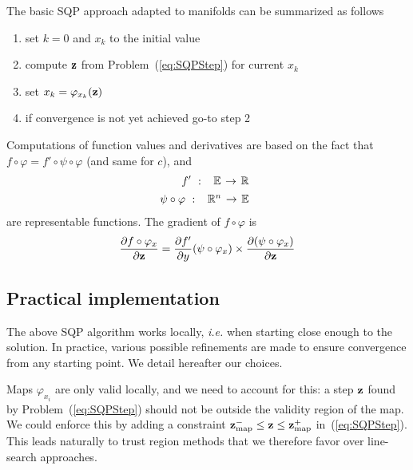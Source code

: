 The basic SQP approach adapted to manifolds can be summarized as follows
\begin{enumerate}
	\item set $k=0$ and $x_k$ to the initial value
  \item compute ${\bf z}$ from Problem~(\ref{eq:SQPStep}) for current $x_k$
  \item set $x_k = \varphi_{x_k}({\bf z})$
	\item if convergence is not yet achieved go-to step 2
\end{enumerate}

Computations of function values and derivatives are based on the fact that $f \circ \varphi = f' \circ \psi \circ \varphi$ (and same for $c$), and
\begin{align}
  f'\ :\
  \begin{array}{ccc}
    \mathbb{E} & \reduce{\rightarrow}{6} & \mathbb{R}
  \end{array} \nonumber \\
	\psi \circ \varphi\ :\
  \begin{array}{ccc}
    \mathbb{R}^n & \reduce{\rightarrow}{6} & \mathbb{E}
  \end{array} \nonumber
\end{align}
are representable functions. The gradient of $f \circ \varphi$ is
\begin{align}
  \frac{\partial f\circ\varphi_x}{\partial {\bf z}}=
  \frac{\partial f'}{\partial y}(\psi\circ\varphi_x)\times
  \frac{\partial (\psi\circ\varphi_x)}{\partial {\bf z}}
\end{align}

\subsection{Practical implementation}
The above SQP algorithm works locally, \emph{i.e.} when starting close enough to the solution. In practice, various possible refinements are made to ensure convergence from any starting point. We detail hereafter our choices.

Maps $\varphi_{x_i}$ are only valid locally, and we need to account for this: a step ${\bf z}$ found by Problem~(\ref{eq:SQPStep}) should not be outside the validity region of the map. We could enforce this by adding a constraint ${\bf z}_{\text{map}}^- \leq {\bf z} \leq {\bf z}_{\text{map}}^+$ in~(\ref{eq:SQPStep}). This leads naturally to trust region methods that we therefore favor over line-search approaches.

